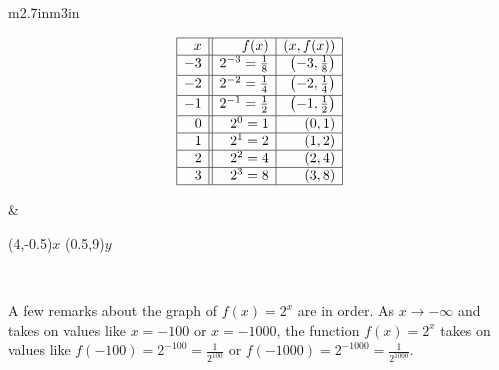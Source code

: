 \documentclass{ximera}
\begin{document}
\hspace{1in} \begin{tabular}{m{2.7in}m{3in}}

\setlength{\extrarowheight}{4pt}
\[ \begin{array}{|r||r|r|}  

\hline

 x & f(x) & (x,f(x)) \\ \hline
-3 & 2^{-3} = \frac{1}{8} & \left(-3, \frac{1}{8} \right) \\ [2pt] \hline
-2 & 2^{-2} = \frac{1}{4} &  \left(-2, \frac{1}{4} \right) \\ [2pt] \hline
-1 & 2^{-1} = \frac{1}{2} &  \left(-1, \frac{1}{2} \right) \\ [2pt]  \hline
0  & 2^{0} = 1 & ( 0 ,1) \\  \hline
1  & 2^{1} = 2 & ( 1, 2) \\  \hline
2  & 2^{2} = 4 & (2,4) \\  \hline
3  & 2^{3} = 8 & (3, 8) \\  \hline
\end{array} \] 
\setlength{\extrarowheight}{2pt}

&

\begin{mfpic}[13]{-4}{4}{-1}{9}

\axes
\tlabel[cc](4,-0.5){\scriptsize $x$}
\tlabel[cc](0.5,9){\scriptsize $y$}
\tlpointsep{4pt}
\penwd{1.25pt}
\arrow \reverse \arrow {}
\end{mfpic} \\

\end{tabular}

A few remarks about the graph of $f(x) = 2^{x}$ are in order.  As $x \rightarrow -\infty$ and takes on values like $x = -100$ or $x=-1000$, the function $f(x) = 2^{x}$ takes on values like $f(-100) = 2^{-100} = \frac{1}{2^{100}}$ or $f(-1000) = 2^{-1000} = \frac{1}{2^{1000}}$.  
\end{document}
